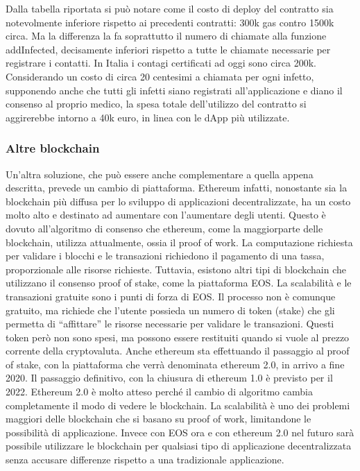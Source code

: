 Dalla tabella riportata si può notare come il costo di deploy del contratto sia notevolmente inferiore rispetto ai precedenti contratti: 300k gas contro 1500k circa. 
Ma la differenza la fa soprattutto il numero di chiamate alla funzione addInfected, decisamente inferiori rispetto a tutte le chiamate necessarie per registrare i contatti.
In Italia i contagi certificati ad oggi sono circa 200k. Considerando un costo di circa 20 centesimi a chiamata per ogni infetto, supponendo anche che tutti gli infetti siano registrati all’applicazione e diano il consenso al proprio medico, la spesa totale dell’utilizzo del contratto si aggirerebbe intorno a 40k euro, in linea con le dApp più utilizzate. \\
\subsubsection{Altre blockchain}
Un’altra soluzione, che può essere anche complementare a quella appena descritta, prevede un cambio di piattaforma. Ethereum infatti, nonostante sia la blockchain più diffusa per lo sviluppo di applicazioni decentralizzate, ha un costo molto alto e destinato ad aumentare con l’aumentare degli utenti.
Questo è dovuto all’algoritmo di consenso che ethereum, come la maggiorparte delle blockchain, utilizza attualmente, ossia il proof of work. La computazione richiesta per validare i blocchi e le transazioni richiedono il pagamento di una tassa, proporzionale alle risorse richieste. 
Tuttavia, esistono altri tipi di blockchain che utilizzano il consenso proof of stake, come la piattaforma EOS.
La scalabilità e le transazioni gratuite sono i punti di forza di EOS. Il processo non è comunque gratuito, ma richiede che l’utente possieda un numero di token (stake) che gli permetta di “affittare” le risorse necessarie per validare le transazioni. Questi token però non sono spesi, ma possono essere restituiti quando si vuole al prezzo corrente della cryptovaluta.
Anche ethereum sta effettuando il passaggio al proof of stake, con la piattaforma che verrà denominata ethereum 2.0, in arrivo a fine 2020. 
Il passaggio definitivo, con la chiusura di ethereum 1.0 è previsto per il 2022.
Ethereum 2.0 è molto atteso perché il cambio di algoritmo cambia completamente il modo di vedere le blockchain. La scalabilità è uno dei problemi maggiori delle blockchain che si basano su proof of work, limitandone le possibilità di applicazione. Invece con EOS ora e con ethereum 2.0 nel futuro sarà possibile utilizzare le blockchain per qualsiasi tipo di applicazione decentralizzata senza accusare differenze rispetto a una tradizionale applicazione.

